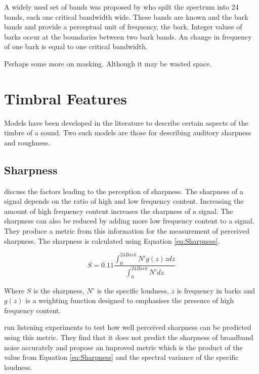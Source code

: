 		A widely used set of bands was proposed by \citet{zwicker1961subdivision} who spilt the spectrum into 24
		bands, each one critical bandwidth wide. These bands are known and the bark bands and provide a perceptual
		unit of frequency, the bark. Integer values of barks occur at the boundaries between two bark bands. An
		change in frequency of one bark is equal to one critical bandwidth.

	\note
	{
		Perhaps some more on masking. Although it may be wasted space.
	}

\section{Timbral Features}
\label{sec:Timbre-TimbralFeatures}
	Models have been developed in the literature to describe certain aspects of the timbre of a sound. Two such models
	are those for describing auditory sharpness and roughness.
	
	\subsection{Sharpness}
	\label{sec:Timbre-TimbralFeatures-Sharpness}
		\citet{fastl2007psychoacoustics} discuss the factors leading to the perception of sharpness. The sharpness
		of a signal depends on the ratio of high and low frequency content. Increasing the amount of high frequency
		content increases the sharpness of a signal. The sharpness can also be reduced by adding more low frequency
		content to a signal. They produce a metric from this information for the measurement of perceived sharpness.
		The sharpness is calculated using Equation \ref{eq:Sharpness}.

		\begin{equation}
			S = 0.11\frac{\int_{0}^{24Bark} N'g(z)zdz}{\int_{0}^{24Bark}N'dz}
			\label{eq:Sharpness}
		\end{equation}

		Where $S$ is the sharpness, $N'$ is the specific loudness, $z$ is frequency in barks and $g(z)$ is a
		weighting function designed to emphasises the presence of high frequency content.

		\citet{marui2006predicting} run listening experiments to test how well perceived sharpness can be predicted
		using this metric. They find that it does not predict the sharpness of broadband noise accurately and
		propose an improved metric which is the product of the value from Equation \ref{eq:Sharpness} and the
		spectral variance of the specific loudness.

